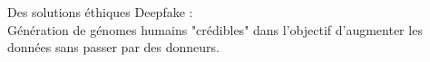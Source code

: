 \begin{frame}{Des solutions éthiques}
  Deepfake :\\ 
  Génération de génomes humains "crédibles" dans l'objectif d'augmenter les données sans passer par des donneurs.
\end{frame}

